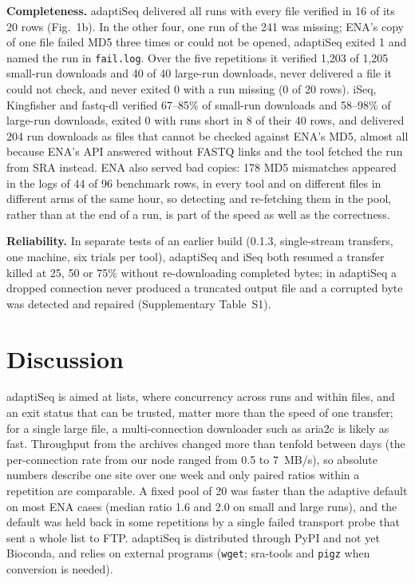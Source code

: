 \documentclass[9pt,twocolumn,a4paper]{extarticle}
\newcommand{\code}[1]{{\small\texttt{#1}}}
\begin{document}
\textbf{Completeness.} adaptiSeq delivered all runs with every file verified in 16 of its 20 rows (Fig.~1b). In the other four, one run of the 241 was missing; ENA's copy of one file failed MD5 three times or could not be opened, adaptiSeq exited 1 and named the run in \code{fail.log}. Over the five repetitions it verified 1,203 of 1,205 small-run downloads and 40 of 40 large-run downloads, never delivered a file it could not check, and never exited 0 with a run missing (0 of 20 rows). iSeq, Kingfisher and fastq-dl verified 67--85\% of small-run downloads and 58--98\% of large-run downloads, exited 0 with runs short in 8 of their 40 rows, and delivered 204 run downloads as files that cannot be checked against ENA's MD5, almost all because ENA's API answered without FASTQ links and the tool fetched the run from SRA instead. ENA also served bad copies: 178 MD5 mismatches appeared in the logs of 44 of 96 benchmark rows, in every tool and on different files in different arms of the same hour, so detecting and re-fetching them in the pool, rather than at the end of a run, is part of the speed as well as the correctness.

\textbf{Reliability.} In separate tests of an earlier build (0.1.3, single-stream transfers, one machine, six trials per tool), adaptiSeq and iSeq both resumed a transfer killed at 25, 50 or 75\% without re-downloading completed bytes; in adaptiSeq a dropped connection never produced a truncated output file and a corrupted byte was detected and repaired (Supplementary Table~S1).

\section{Discussion}
adaptiSeq is aimed at lists, where concurrency across runs and within files, and an exit status that can be trusted, matter more than the speed of one transfer; for a single large file, a multi-connection downloader such as aria2c is likely as fast. Throughput from the archives changed more than tenfold between days (the per-connection rate from our node ranged from 0.5 to 7~MB/s), so absolute numbers describe one site over one week and only paired ratios within a repetition are comparable. A fixed pool of 20 was faster than the adaptive default on most ENA cases (median ratio 1.6 and 2.0 on small and large runs), and the default was held back in some repetitions by a single failed transport probe that sent a whole list to FTP. adaptiSeq is distributed through PyPI and not yet Bioconda, and relies on external programs (\code{wget}; sra-tools and \code{pigz} when conversion is needed).
\end{document}
